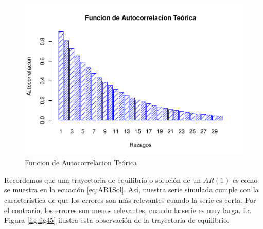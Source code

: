 \documentclass[
]{book}
\begin{document}
\begin{figure}

{\centering \includegraphics{Notas-Series-Tiempo_files/figure-latex/fig44-1} 

}

\caption{Funcion de Autocorrelacion Teórica}\label{fig:fig44}
\end{figure}

Recordemos que una trayectoria de equilibrio o solución de un \(AR(1)\) es como se muestra en la ecuación \eqref{eq:AR1Sol}. Así, nuestra serie simulada cumple con la característica de que los errores son más relevantes cuando la serie es corta. Por el contrario, los errores son menos relevantes, cuando la serie es muy larga. La Figura \ref{fig:fig45} ilustra esta observación de la trayectoria de
equilibrio.
\end{document}
